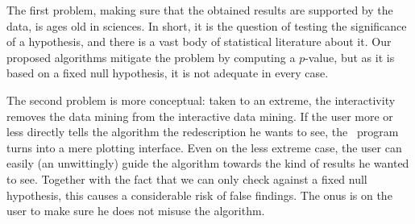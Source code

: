 The first problem, making sure that the obtained results are supported
by the data, is ages old in sciences. In short, it is the question of
testing the significance of a hypothesis, and there is a vast body of
statistical literature about it. Our proposed algorithms mitigate the
problem by computing a $p$-value, but as it is based on a fixed null
hypothesis, it is not adequate in every case.

The second problem is more conceptual: taken to an extreme, the
interactivity removes the data mining from the interactive data
mining. If the user more or less directly tells the algorithm the
redescription he wants to see, the \Siren\ program turns into a mere
plotting interface. Even on the less extreme case, the user can easily
(an unwittingly) guide the algorithm towards the kind of results he
wanted to see. Together with the fact that we can only check against a
fixed null hypothesis, this causes a considerable risk of false
findings. The onus is on the user to make sure he does not misuse the algorithm.


